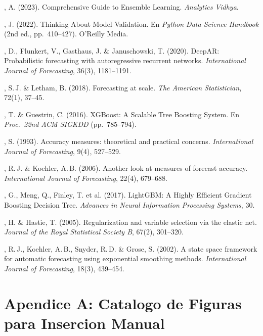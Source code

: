 \documentclass[12pt, letterpaper]{article}
\begin{document}
\begin{enumerate}[label={[\arabic*]}, leftmargin=*, noitemsep]
    \itemSingh, A. (2023). Comprehensive Guide to Ensemble Learning. \textit{Analytics Vidhya}.

    \itemVanderPlas, J. (2022). Thinking About Model Validation. En \textit{Python Data Science Handbook} (2nd ed., pp.~410--427). O'Reilly Media.

    \itemSalinas, D., Flunkert, V., Gasthaus, J. \& Januschowski, T. (2020). DeepAR: Probabilistic forecasting with autoregressive recurrent networks. \textit{International Journal of Forecasting}, 36(3), 1181--1191.

    \itemTaylor, S.\,J. \& Letham, B. (2018). Forecasting at scale. \textit{The American Statistician}, 72(1), 37--45.

    \itemChen, T. \& Guestrin, C. (2016). XGBoost: A Scalable Tree Boosting System. En \textit{Proc.\ 22nd ACM SIGKDD} (pp.~785--794).

    \itemMakridakis, S. (1993). Accuracy measures: theoretical and practical concerns. \textit{International Journal of Forecasting}, 9(4), 527--529.

    \itemHyndman, R.\,J. \& Koehler, A.\,B. (2006). Another look at measures of forecast accuracy. \textit{International Journal of Forecasting}, 22(4), 679--688.

    \itemKe, G., Meng, Q., Finley, T. et al. (2017). LightGBM: A Highly Efficient Gradient Boosting Decision Tree. \textit{Advances in Neural Information Processing Systems}, 30.

    \itemZou, H. \& Hastie, T. (2005). Regularization and variable selection via the elastic net. \textit{Journal of the Royal Statistical Society B}, 67(2), 301--320.

    \itemHyndman, R.\,J., Koehler, A.\,B., Snyder, R.\,D. \& Grose, S. (2002). A state space framework for automatic forecasting using exponential smoothing methods. \textit{International Journal of Forecasting}, 18(3), 439--454.
\end{enumerate}

\newpage

\section*{Apendice A: Catalogo de Figuras para Insercion Manual}
\end{document}
